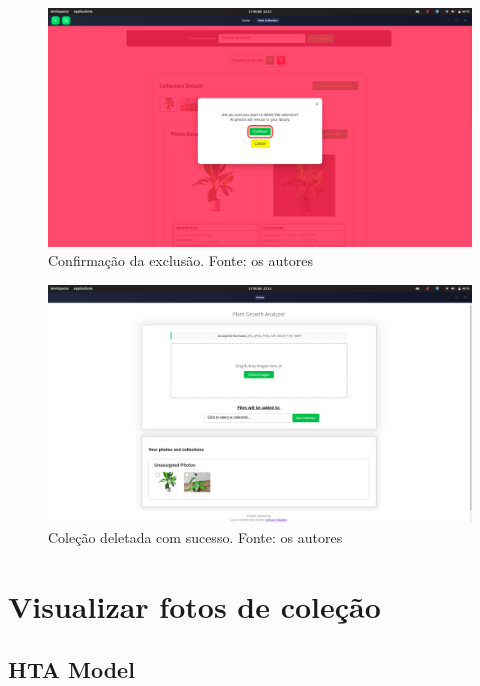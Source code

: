 \begin{figure}[H]
    \centering
    \includegraphics[width=1\textwidth]{../figures/screens/uc009/Screenshot from 2025-06-27 22-13-38.png}
    \caption{Confirmação da exclusão. Fonte: os autores}
    \label{fig:uc009-screen3}
\end{figure}

\begin{figure}[H]
    \centering
    \includegraphics[width=1\textwidth]{../figures/screens/uc009/Screenshot from 2025-06-27 22-13-42.png}
    \caption{Coleção deletada com sucesso. Fonte: os autores}
    \label{fig:uc009-screen4}
\end{figure}

\section{Visualizar fotos de coleção}

\subsection{HTA Model}

